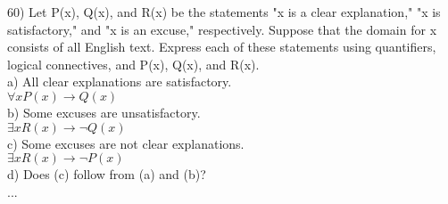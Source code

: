 \documentclass{article}
\begin{document}
\begin{flushleft}
\setlength\parindent{0pt}60) Let P(x), Q(x), and R(x) be the statements "x is a clear explanation," "x is satisfactory," and "x is an excuse," respectively.  Suppose that the domain for x consists of all English text.  Express each of these statements using quantifiers, logical connectives, and P(x), Q(x), and R(x).\\
\setlength\parindent{24pt}a) All clear explanations are satisfactory.\\
\setlength\parindent{48pt} $\forall x P(x) \rightarrow Q(x)$\\
\setlength\parindent{24pt}b) Some excuses are unsatisfactory.\\
\setlength\parindent{48pt} $\exists x R(x) \rightarrow \neg Q(x)$ \\
\setlength\parindent{24pt}c) Some excuses are not clear explanations.\\
\setlength\parindent{48pt} $\exists x R(x) \rightarrow \neg P(x)$\\
\setlength\parindent{24pt}d) Does (c) follow from (a) and (b)?\\
\setlength\parindent{48pt} ...\\









\end{flushleft}
\end{document}
